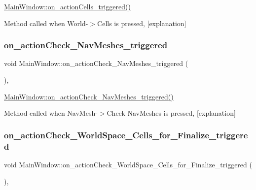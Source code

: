 \hyperlink{class_main_window_abe162b3673599552213251a049a93eac}{Main\+Window\+::on\+\_\+action\+Cells\+\_\+triggered()} 

Method called when World-\/$>$Cells is pressed, \mbox{[}explanation\mbox{]} \mbox{\label{class_main_window_a7b839044120c99de319e916b3804423d}} 
\subsubsection{\texorpdfstring{on\+\_\+action\+Check\+\_\+\+Nav\+Meshes\+\_\+triggered}{on\_actionCheck\_NavMeshes\_triggered}}
{\footnotesize\ttfamily void Main\+Window\+::on\+\_\+action\+Check\+\_\+\+Nav\+Meshes\+\_\+triggered (\begin{DoxyParamCaption}{ }\end{DoxyParamCaption})\hspace{0.3cm}{\ttfamily [private]}, {\ttfamily [slot]}}



\hyperlink{class_main_window_a7b839044120c99de319e916b3804423d}{Main\+Window\+::on\+\_\+action\+Check\+\_\+\+Nav\+Meshes\+\_\+triggered()} 

Method called when Nav\+Mesh-\/$>$Check Nav\+Meshes is pressed, \mbox{[}explanation\mbox{]} \mbox{\label{class_main_window_aa95e768258ffcd2b4d8f2460e620f9db}} 
\subsubsection{\texorpdfstring{on\+\_\+action\+Check\+\_\+\+World\+Space\+\_\+\+Cells\+\_\+for\+\_\+\+Finalize\+\_\+triggered}{on\_actionCheck\_WorldSpace\_Cells\_for\_Finalize\_triggered}}
{\footnotesize\ttfamily void Main\+Window\+::on\+\_\+action\+Check\+\_\+\+World\+Space\+\_\+\+Cells\+\_\+for\+\_\+\+Finalize\+\_\+triggered (\begin{DoxyParamCaption}{ }\end{DoxyParamCaption})\hspace{0.3cm}{\ttfamily [private]}, {\ttfamily [slot]}}



